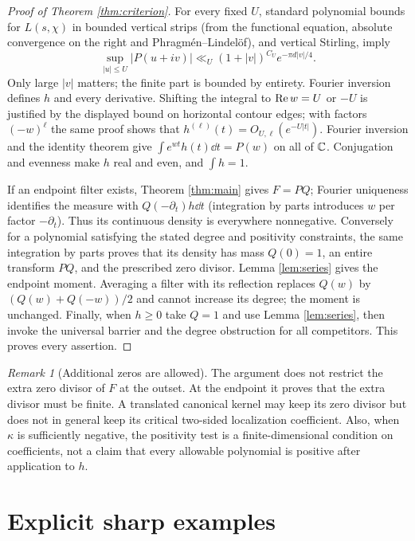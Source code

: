 \documentclass[11pt]{article}
\theoremstyle{definition}\newtheorem{definition}[theorem]{Definition}
\theoremstyle{remark}\newtheorem{remark}[theorem]{Remark}
\begin{document}
\begin{proof}[Proof of Theorem \ref{thm:criterion}]
For every fixed $U$, standard polynomial bounds for $L(s,\chi)$ in bounded vertical strips (from the functional equation, absolute convergence on the right and Phragm\'en--Lindel\"of), and vertical Stirling, imply
\[
 \sup_{|u|\le U}|P(u+iv)|\ll_U (1+|v|)^{C_U} e^{-\pi d |v|/4}.
\]
Only large $|v|$ matters; the finite part is bounded by entirety. Fourier inversion defines $h$ and every derivative. Shifting the integral to $\operatorname{Re} w=U$ or $-U$ is justified by the displayed bound on horizontal contour edges; with factors $(-w)^\ell$ the same proof shows that $h^{(\ell)}(t)=O_{U,\ell}(e^{-U|t|})$. Fourier inversion and the identity theorem give $\int e^{wt}h(t)\dd t=P(w)$ on all of $\mathbb C$. Conjugation and evenness make $h$ real and even, and $\int h=1$.

If an endpoint filter exists, Theorem \ref{thm:main} gives $F=PQ$; Fourier uniqueness identifies the measure with $Q(-\partial_t)h\dd t$ (integration by parts introduces $w$ per factor $-\partial_t$). Thus its continuous density is everywhere nonnegative. Conversely for a polynomial satisfying the stated degree and positivity constraints, the same integration by parts proves that its density has mass $Q(0)=1$, an entire transform $PQ$, and the prescribed zero divisor. Lemma \ref{lem:series} gives the endpoint moment. Averaging a filter with its reflection replaces $Q(w)$ by $(Q(w)+Q(-w))/2$ and cannot increase its degree; the moment is unchanged. Finally, when $h\ge0$ take $Q=1$ and use Lemma \ref{lem:series}, then invoke the universal barrier and the degree obstruction for all competitors. This proves every assertion.
\end{proof}

\begin{remark}[Additional zeros are allowed]
The argument does not restrict the extra zero divisor of $F$ at the outset. At the endpoint it proves that the extra divisor must be finite. A translated canonical kernel may keep its zero divisor but does not in general keep its critical two-sided localization coefficient. Also, when $\kappa$ is sufficiently negative, the positivity test is a finite-dimensional condition on coefficients, not a claim that every allowable polynomial is positive after application to $h$.
\end{remark}

\section{Explicit sharp examples}
\end{document}
